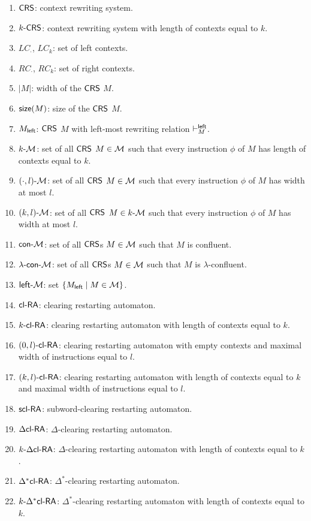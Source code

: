 \begin{enumerate}[]
\item $\textup{\sf CRS\/}$: context rewriting system.
\item $\textup{\sf $k$-\textup{\sf CRS\/}}$: context rewriting system with length of contexts equal to $k$.
\item $LC_{\cdot}$, $LC_k$: set of left contexts.
\item $RC_{\cdot}$, $RC_k$: set of right contexts.
\item $|M|$: width of the $\textup{\sf CRS\/}$ $M$.
\item $\textup{\sf size}(M)$: size of the $\textup{\sf CRS\/}$ $M$.
\item $M_{\sf left}$: $\textup{\sf CRS\/}$ $M$ with left-most rewriting relation $\vdash^{\sf left}_M$.
\item $\textup{\sf $k$-\textup{\sf $\mathcal{M}$}}$: set of all $\textup{\sf CRS\/}$ $M \in \textup{\sf $\mathcal{M}$}$ such that every instruction $\phi$ of $M$ has length of contexts equal to $k$.
\item $\textup{\sf $(\cdot,l)$-\textup{\sf $\mathcal{M}$}}$: set of all $\textup{\sf CRS\/}$ $M \in \textup{\sf $\mathcal{M}$}$ such that every instruction $\phi$ of $M$ has width at most $l$.
\item $\textup{\sf $(k,l)$-\textup{\sf $\mathcal{M}$}}$: set of all $\textup{\sf CRS\/}$ $M \in \textup{\sf $k$-\textup{\sf $\mathcal{M}$}}$ such that every instruction $\phi$ of $M$ has width at most $l$.
\item $\textup{\sf con-\textup{\sf $\mathcal{M}$}}$: set of all $\textup{\sf CRS\/}$s $M \in \textup{\sf $\mathcal{M}$}$ such that $M$ is confluent.
\item $\textup{\sf $\lambda$-con-\textup{\sf $\mathcal{M}$}}$: set of all $\textup{\sf CRS\/}$s $M \in \textup{\sf $\mathcal{M}$}$ such that $M$ is $\lambda$-confluent.
\item $\textup{\sf left-\textup{\sf $\mathcal{M}$}}$: set $\{M_{\sf left} \mid M \in \textup{\sf $\mathcal{M}$}\}$.
\item $\textup{\sf cl-RA\/}$: clearing restarting automaton.
\item $\textup{\sf $k$-\textup{\sf cl-RA\/}}$: clearing restarting automaton with length of contexts equal to $k$.
\item $\textup{\sf $(0,l)$-\textup{\sf cl-RA\/}}$: clearing restarting automaton with empty contexts and maximal width of instructions equal to $l$.
\item $\textup{\sf $(k,l)$-\textup{\sf cl-RA\/}}$: clearing restarting automaton with length of contexts equal to $k$ and maximal width of instructions equal to $l$.
\item $\textup{\sf scl-RA}$: subword-clearing restarting automaton.
\item $\textup{\sf $\Delta$cl-RA\/}$: $\Delta$-clearing restarting automaton.
\item $\textup{\sf $k$-\textup{\sf $\Delta$cl-RA\/}}$: $\Delta$-clearing restarting automaton with length of contexts equal to $k$.
\item $\textup{\sf $\Delta^*$cl-RA\/}$: $\Delta^*$-clearing restarting automaton.
\item $\textup{\sf $k$-\textup{\sf $\Delta^*$cl-RA\/}}$: $\Delta^*$-clearing restarting automaton with length of contexts equal to $k$. 
\end{enumerate}

